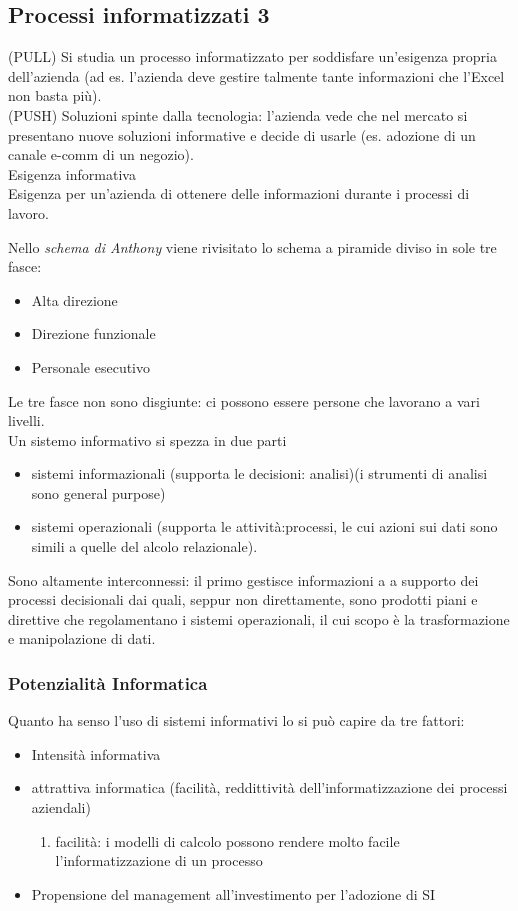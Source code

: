 \subsection{Processi informatizzati 3}
\label{sub:Processi informatizzati 3}
(PULL) Si studia un processo informatizzato per soddisfare un'esigenza propria dell'azienda
(ad es. l'azienda deve gestire talmente tante informazioni che l'Excel non basta pi\`u).\\
(PUSH) Soluzioni spinte dalla tecnologia: l'azienda vede che nel mercato si
presentano nuove soluzioni informative e decide di usarle (es. adozione di un canale e-comm
di un negozio).\\
Esigenza informativa\\
Esigenza per un'azienda di ottenere delle informazioni durante i processi di lavoro.

Nello \textit{schema di Anthony} viene rivisitato lo schema a piramide diviso in sole tre fasce:
\begin{itemize}
  \item Alta direzione
  \item Direzione funzionale
  \item Personale esecutivo
\end{itemize}
Le tre fasce non sono disgiunte: ci possono essere persone che lavorano a vari livelli.\\
Un sistemo informativo si spezza in due parti
\begin{itemize}
  \item sistemi informazionali (supporta le decisioni: analisi)(i strumenti di analisi
sono general purpose)
  \item sistemi operazionali (supporta le attivit\`a:processi, le cui azioni sui dati sono
  simili a quelle del alcolo relazionale).
\end{itemize}


Sono altamente interconnessi: il primo gestisce informazioni a a supporto
dei processi decisionali dai quali, seppur non direttamente, sono prodotti piani
e direttive che regolamentano i sistemi operazionali, il cui scopo \`e la trasformazione
e manipolazione di dati.

\subsubsection{Potenzialit\`a Informatica}

Quanto ha senso l'uso di sistemi informativi lo si pu\`o capire da tre fattori:
\begin{itemize}
  \item Intensit\`a informativa
  \item attrattiva informatica (facilit\`a, reddittivit\`a dell'informatizzazione
  dei processi aziendali)
  \begin{enumerate}
    \item facilit\`a: i modelli di calcolo possono rendere molto facile l'informatizzazione
    di un processo
  \end{enumerate}
  \item Propensione del management all'investimento per l'adozione di SI
\end{itemize}
